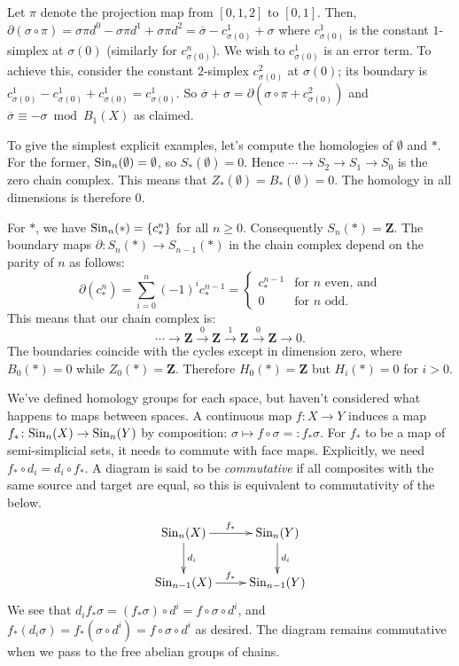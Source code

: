 Let $\pi$ denote the projection map from $[0,1,2]$ to $[0,1]$. Then, $\partial(\sigma\circ\pi)=\sigma\pi d^0-\sigma\pi d^1 +\sigma\pi d^2=\overline{\sigma}-c^1_{\sigma(0)}+\sigma$ where $c^1_{\sigma(0)}$ is the constant $1$-simplex at $\sigma(0)$ (similarly for $c^n_{\sigma(0)}$). We wish to $c^1_{\sigma(0)}$ is an error term. To achieve this, consider the constant $2$-simplex $c^2_{\sigma(0)}$ at $\sigma(0)$; its boundary is $c^1_{\sigma(0)}-c^1_{\sigma(0)}+c^1_{\sigma(0)}=c^1_{\sigma(0)}$. So $\overline{\sigma}+\sigma=\partial(\sigma\circ\pi + c^2_{\sigma(0)})$ and $\overline{\sigma}\equiv -\sigma\bmod B_1(X)$ as claimed.

To give the simplest explicit examples, let's compute the homologies of $\emptyset$ and $\ast$. For the former, $\mathrm{Sin}_n(\emptyset)=\emptyset$, so $S_\ast(\emptyset)=0$. Hence $\cdots\to S_2\to S_1\to S_0$ is the zero chain complex. This means that $Z_\ast(\emptyset)=B_\ast(\emptyset)=0$. The homology in all dimensions is therefore $0$.

For $\ast$, we have $\mathrm{Sin}_n(\ast)=\{c^n_\ast\}$ for all $n\geq 0$. Consequently $S_n(\ast)=\mathbf{Z}$. The boundary maps $\partial\colon S_n(\ast)\to S_{n-1}(\ast)$ in the chain complex depend on the parity of $n$ as follows:
\[\partial(c^n_\ast)=\sum_{i=0}^{n}(-1)^i c^{n-1}_\ast=
\begin{cases}
    c^{n-1}_* & \text{for } n \text{ even, and}\\
    0 & \text{for } n \text{ odd.}
  \end{cases}
\]
This means that our chain complex is:
$$\cdots\to\mathbf{Z}\xrightarrow{0}\mathbf{Z}\xrightarrow{1}\mathbf{Z}\xrightarrow{0}\mathbf{Z}\to 0.$$
The boundaries coincide with the cycles except in dimension zero, where $B_0(\ast)=0$ while $Z_0(\ast)=\mathbf{Z}$. Therefore $ H_0(\ast)=\mathbf{Z}$ but $ H_i(\ast)=0$ for $i>0$.

We've defined homology groups for each space, but haven't considered what happens to maps between spaces. A continuous map $f\colon X\to Y$ induces a map $f_\ast\colon \mathrm{Sin}_n(X)\to\mathrm{Sin}_n(Y)$ by composition: $\sigma\mapsto f\circ \sigma=:f_\ast\sigma$. For $f_\ast$ to be a map of semi-simplicial sets, it needs to commute with face maps. Explicitly, we need $f_\ast \circ d_i = d_i \circ f_\ast$. A diagram is said to be \emph{commutative} if all composites with the same source and target are equal, so this is equivalent to commutativity of the below.
\begin{eqnarray*}
\xymatrix{\Sin_n(X)\ar[r]^{f_\ast}\ar[d]^{d_i} & \Sin_n(Y)\ar[d]^{d_i}\\
\Sin_{n-1}(X)\ar[r]^{f_\ast} & \Sin_{n-1}(Y)}
\end{eqnarray*}
We see that $d_if_\ast\sigma=(f_\ast\sigma)\circ d^i=f\circ\sigma\circ d^i$, and $f_\ast(d_i\sigma)=f_\ast(\sigma\circ d^i)=f\circ\sigma\circ d^i$ as desired. The diagram remains commutative when we pass to the free abelian groups of chains.

